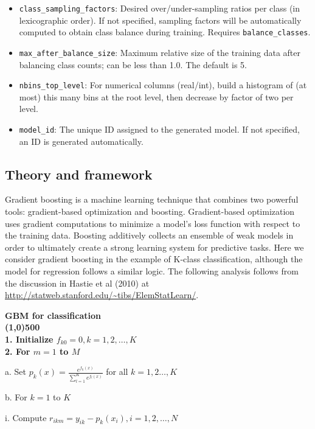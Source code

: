 \begin{itemize}
\item {\texttt{class\_sampling\_factors}}: Desired over/under-sampling ratios per class (in lexicographic order). If not specified, sampling factors will be automatically computed to obtain class balance during training. Requires \texttt{balance\_classes}.
\item {\texttt{max\_after\_balance\_size}}: Maximum relative size of the training data after balancing class counts; can be less than 1.0.  The default is 5.
\item {\texttt{nbins\_top\_level}}: For numerical columns (real/int), build a histogram of (at most) this many bins at the root level, then decrease by factor of two per level.
\item \texttt{model\_id}: The unique ID assigned to the generated model. If not specified, an ID is generated automatically.
\end{itemize}



\subsection{Theory and framework}

Gradient boosting is a machine learning technique that combines two powerful tools: gradient-based optimization and
boosting. Gradient-based optimization uses gradient computations to minimize a model's loss function with respect to
the training data. Boosting additively collects an ensemble of weak models in order to ultimately create a strong
learning system for predictive tasks. Here we consider gradient boosting in the example of K-class classification,
although the model for regression follows a similar logic. The following analysis follows from the discussion in
Hastie et al (2010) at {\url{http://statweb.stanford.edu/~tibs/ElemStatLearn/}}.

\newpage
\bf{\footnotesize{GBM for classification}}
\normalfont
\\
\line(1,0){500}
\\
1. Initialize $f_{k0} = 0, k = 1,2,\dots,K$
\\
2. For $m=1$ to $M$

\hspace{1cm} a. Set $p_k(x) = \frac{e^{f_k(x)}}{\sum_{l=1}^K e^{f_l(x)}}$ for all $k = 1,2\dots, K$

\hspace{1cm} b. For $k=1$ to $K$

\hspace{2cm} i. Compute $r_{ikm} = y_{ik} - p_k(x_i),  i = 1,2,\dots,N$

